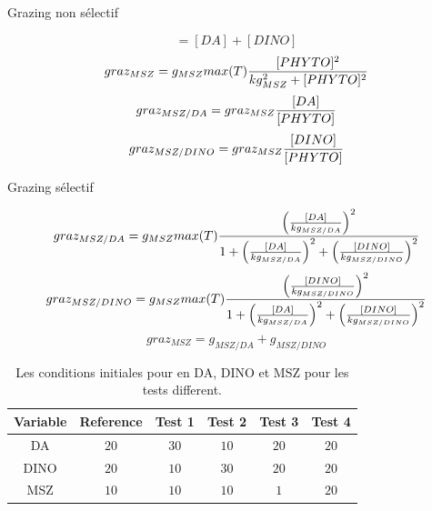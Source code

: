\par{
Grazing non sélectif
}

\begin{equation}
  [PHYTO] = [DA] + [DINO]
  \label{eq:partie2nonSelEq1}
\end{equation}
\begin{equation}
  graz_{MSZ} = g_{MSZ} max(T) {{[PHYTO]^2}\over{kg_{MSZ}^2 + [PHYTO]^2}}
  \label{eq:partie2nonSelEq2}  
\end{equation}
\begin{equation}
  graz_{MSZ/DA} = graz_{MSZ} {{[DA]}\over{[PHYTO]}}
  \label{eq:partie2nonSelEq2}
\end{equation}
\begin{equation}
  graz_{MSZ/DINO} = graz_{MSZ} {{[DINO]}\over{[PHYTO]}}
  \label{eq:partie2nonSelEq3}
\end{equation}

\par{
Grazing sélectif
}

\begin{equation}
  graz_{MSZ/DA} = g_{MSZ} max(T) {{\left ( {{[DA]}\over{kg_{MSZ/DA}}}\right )^2}\over
{1 + \left ( {{[DA]}\over{kg_{MSZ/DA}}} \right )^2 + \left ( {{[DINO]}\over{kg_{MSZ/DINO}}} \right )^2}}
  \label{eq:partie2selEq1}
\end{equation}
\begin{equation}
  graz_{MSZ/DINO} = g_{MSZ} max(T) {{\left ( {{[DINO]}\over{kg_{MSZ/DINO}}}\right )^2}\over
{1 + \left ( {{[DA]}\over{kg_{MSZ/DA}}} \right )^2 + \left ( {{[DINO]}\over{kg_{MSZ/DINO}}} \right )^2}}
  \label{eq:partie2selEq2}
\end{equation}
\begin{equation}
  graz_{MSZ} = g_{MSZ/DA} + g_{MSZ/DINO}
  \label{eq:partie2selEq3}
\end{equation}

\begin{table}
\begin{center}
\begin{tabular}{ | c | c | c | c | c | c | }
\hline
Variable & Reference & Test 1 & Test 2 & Test 3 & Test 4 \\
\hline
DA & $20$ & $30$ & $10$ & $20$ & $20$ \\
DINO & $20$ & $10$ & $30$ & $20$ & $20$ \\
MSZ & $10$ & $10$ & $10$ & $1$ & $20$ \\
\hline
\end{tabular}
\end{center}
  \caption{Les conditions initiales pour en DA, DINO et MSZ pour les tests different.}
  \label{tab:partie2params}
\end{table}

